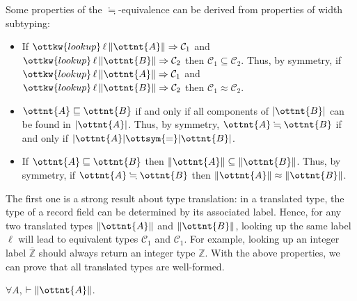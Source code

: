 \begin{lemma}\label{thm:trans}
  Some properties of the $ \fallingdotseq $-equivalence can be derived from properties of width subtyping:
  \begin{itemize}
  \item If $\ottkw{lookup} \, \ell \, \|  \ottnt{A}  \|  \Rightarrow  \mathcal{C}_{{\mathrm{1}}}$ and $\ottkw{lookup} \, \ell \, \|  \ottnt{B}  \|  \Rightarrow  \mathcal{C}_{{\mathrm{2}}}$
    then $ \mathcal{C}_{{\mathrm{1}}}  \subseteq  \mathcal{C}_{{\mathrm{2}}} $.
    Thus, by symmetry, if $\ottkw{lookup} \, \ell \, \|  \ottnt{A}  \|  \Rightarrow  \mathcal{C}_{{\mathrm{1}}}$ and $\ottkw{lookup} \, \ell \, \|  \ottnt{B}  \|  \Rightarrow  \mathcal{C}_{{\mathrm{2}}}$
    then $\mathcal{C}_{{\mathrm{1}}}  \approx  \mathcal{C}_{{\mathrm{2}}}$.
  \item $ \ottnt{A}  \sqsubseteq  \ottnt{B} $ if and only if all components of $ | \ottnt{B} | $ can be found in $ | \ottnt{A} | $.
    Thus, by symmetry, $\ottnt{A}  \fallingdotseq  \ottnt{B}$ if and only if  $ | \ottnt{A} |   \ottsym{=}   | \ottnt{B} | $.
  \item If $ \ottnt{A}  \sqsubseteq  \ottnt{B} $ then $ \|  \ottnt{A}  \|  \subseteq  \|  \ottnt{B}  \| $. Thus, by symmetry,
    if $\ottnt{A}  \fallingdotseq  \ottnt{B}$ then $\|  \ottnt{A}  \|  \approx  \|  \ottnt{B}  \|$.
  \end{itemize}
\end{lemma}

\noindent
The first one is a strong result about type translation: in a translated type,
the type of a record field can be determined by its associated label. Hence, for
any two translated types $\|  \ottnt{A}  \|$ and $\|  \ottnt{B}  \|$, looking up the same label
$\ell$ will lead to equivalent types $\mathcal{C}_{{\mathrm{1}}}$ and $\mathcal{C}_{{\mathrm{1}}}$. For example,
looking up an integer label $ \overline{\mathbb{Z} } $ should always return an integer type
$ \mathbb{Z} $. With the above properties, we can prove that all translated types
are well-formed.

\begin{lemma}\label{thm:wf-trans}
  $\forall A$, $\vdash  \|  \ottnt{A}  \|$.
\end{lemma}

